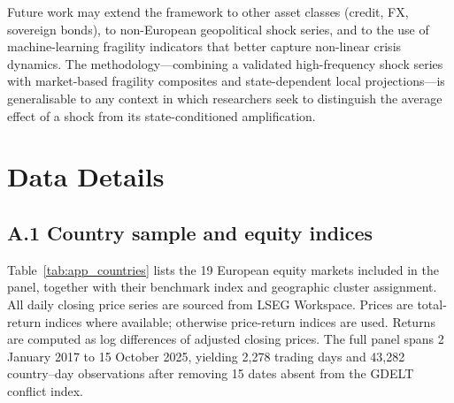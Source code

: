 \documentclass[11pt]{article}
\begin{document}
Future work may extend the framework to other asset classes (credit, FX,
sovereign bonds), to non-European geopolitical shock series, and to the
use of machine-learning fragility indicators that better capture non-linear
crisis dynamics. The methodology---combining a validated high-frequency shock
series with market-based fragility composites and state-dependent local
projections---is generalisable to any context in which researchers seek to
distinguish the average effect of a shock from its state-conditioned amplification.

\appendix

\section{Data Details}
\label{app:data}

\subsection*{A.1 Country sample and equity indices}

Table~\ref{tab:app_countries} lists the 19 European equity markets included in the panel, together with their benchmark index and geographic cluster assignment. All daily closing price series are sourced from LSEG Workspace. Prices are total-return indices where available; otherwise price-return indices are used. Returns are computed as log differences of adjusted closing prices. The full panel spans 2 January 2017 to 15 October 2025, yielding 2{,}278 trading days and 43{,}282 country--day observations after removing 15 dates absent from the GDELT conflict index.
\end{document}
